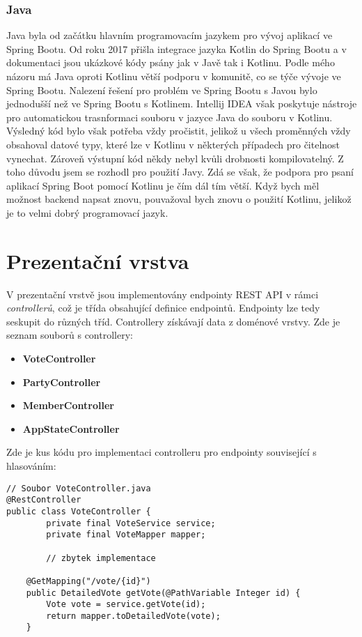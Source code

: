 \subsubsection*{Java}
Java byla od začátku hlavním programovacím jazykem pro vývoj aplikací ve Spring Bootu. Od roku 2017 přišla integrace jazyka Kotlin do Spring Bootu \cite{kotlin-support} a v dokumentaci jsou ukázkové kódy psány jak v Javě tak i Kotlinu. Podle mého názoru má Java oproti Kotlinu větší podporu v komunitě, co se týče vývoje ve Spring Bootu. Nalezení řešení pro problém ve Spring Bootu \linebreak s Javou bylo jednodušší než ve Spring Bootu s Kotlinem. Intellij IDEA však poskytuje nástroje pro automatickou trasnformaci souboru v jazyce Java do souboru v Kotlinu. Výsledný kód bylo však potřeba vždy pročistit, jelikož u všech proměnných vždy obsahoval datové typy, které lze \linebreak v Kotlinu v některých případech pro čitelnost vynechat. Zároveň výstupní kód někdy nebyl kvůli drobnosti kompilovatelný. Z toho důvodu jsem se rozhodl pro použití Javy. Zdá se však, že podpora pro psaní aplikací Spring Boot pomocí Kotlinu je čím dál tím větší. Když bych měl možnost backend napsat znovu, pouvažoval bych znovu o použití Kotlinu, jelikož je to velmi dobrý programovací jazyk.

\section {Prezentační vrstva}
V prezentační vrstvě jsou implementovány endpointy REST API v rámci \textit{controllerů}, což je třída obsahující definice endpointů. Endpointy lze tedy seskupit do různých tříd. Controllery získávají data z doménové vrstvy. Zde je seznam souborů s controllery:

\begin{itemize}
	\item \textbf{VoteController}
	\item \textbf{PartyController}
	\item \textbf{MemberController}
	\item \textbf{AppStateController}
\end{itemize}

\noindent Zde je kus kódu pro implementaci controlleru pro endpointy související s hlasováním:

\newpage

\begin{lstlisting}[caption={Ukázka kódu pro vytvoření endpointu}, label={lst:controller-votes}, tabsize=2]
// Soubor VoteController.java
@RestController
public class VoteController {
		private final VoteService service;
		private final VoteMapper mapper;
		
		// zbytek implementace
		
	@GetMapping("/vote/{id}")
	public DetailedVote getVote(@PathVariable Integer id) {
		Vote vote = service.getVote(id);
		return mapper.toDetailedVote(vote);
	}
\end{lstlisting}

